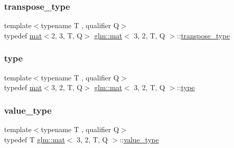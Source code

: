 \mbox{\label{structglm_1_1mat_3_013_00_012_00_01_t_00_01_q_01_4_ab5fe2bf92b71a51cd33be87c6c9ef7d1}} 
\subsubsection{\texorpdfstring{transpose\+\_\+type}{transpose\_type}}
{\footnotesize\ttfamily template$<$typename T , qualifier Q$>$ \\
typedef \mbox{\hyperlink{structglm_1_1mat}{mat}}$<$2, 3, T, Q$>$ \mbox{\hyperlink{structglm_1_1mat}{glm\+::mat}}$<$ 3, 2, T, Q $>$\+::\mbox{\hyperlink{structglm_1_1mat_3_013_00_012_00_01_t_00_01_q_01_4_ab5fe2bf92b71a51cd33be87c6c9ef7d1}{transpose\+\_\+type}}}

\mbox{\label{structglm_1_1mat_3_013_00_012_00_01_t_00_01_q_01_4_acc76b4ad182b342b586dce28e0da8e16}} 
\subsubsection{\texorpdfstring{type}{type}}
{\footnotesize\ttfamily template$<$typename T , qualifier Q$>$ \\
typedef \mbox{\hyperlink{structglm_1_1mat}{mat}}$<$3, 2, T, Q$>$ \mbox{\hyperlink{structglm_1_1mat}{glm\+::mat}}$<$ 3, 2, T, Q $>$\+::\mbox{\hyperlink{structglm_1_1mat_3_013_00_012_00_01_t_00_01_q_01_4_acc76b4ad182b342b586dce28e0da8e16}{type}}}

\mbox{\label{structglm_1_1mat_3_013_00_012_00_01_t_00_01_q_01_4_ae1e6e1cc8ff07c13ae805cabd6cefd77}} 
\subsubsection{\texorpdfstring{value\+\_\+type}{value\_type}}
{\footnotesize\ttfamily template$<$typename T , qualifier Q$>$ \\
typedef T \mbox{\hyperlink{structglm_1_1mat}{glm\+::mat}}$<$ 3, 2, T, Q $>$\+::\mbox{\hyperlink{structglm_1_1mat_3_013_00_012_00_01_t_00_01_q_01_4_ae1e6e1cc8ff07c13ae805cabd6cefd77}{value\+\_\+type}}}



